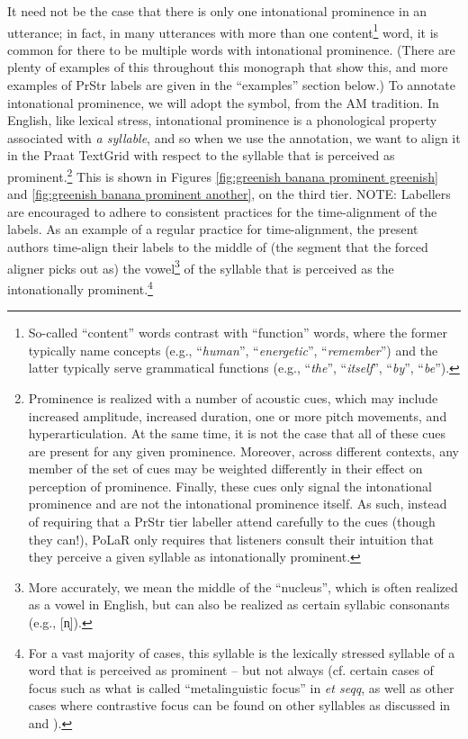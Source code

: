 \documentclass[11pt, twoside]{memoir}
\def\textlabel#1{{\relsize{-.5}\fontspec[Mapping=tex-text]{Roboto Mono}{#1}}}
\def\langtext#1{\textit{#1}}
\begin{document}
It need not be the case that there is only one intonational prominence in an utterance; in fact, in many utterances with more than one content\footnote{So-called “content” words contrast with “function” words, where the former typically name concepts (e.g., “\langtext{human}”, “\langtext{energetic}”, “\langtext{remember}”) and the latter typically serve grammatical functions (e.g., “\langtext{the}”, “\langtext{itself}”, “\langtext{by}”, “\langtext{be}”).} word, it is common for there to be multiple words with intonational prominence. (There are plenty of examples of this throughout this monograph that show this, and more examples of PrStr labels are given in the “examples” section below.)
To annotate intonational prominence, we will adopt the \textlabel{*} symbol, from the AM tradition. In English, like lexical stress, intonational prominence is a phonological property associated with \textit{a syllable}, and so when we use the \textlabel{*} annotation, we want to align it in the Praat TextGrid with respect to the syllable that is perceived as prominent.\footnote{Prominence is realized with a number of acoustic cues, which may include increased amplitude, increased duration, one or more pitch movements, and hyperarticulation. At the same time, it is not the case that all of these cues are present for any given prominence. Moreover, across different contexts, any member of the set of cues may be weighted differently in their effect on perception of prominence. Finally, these cues only signal the intonational prominence and are not the intonational prominence itself. As such, instead of requiring that a PrStr tier labeller attend carefully to the cues (though they can!), PoLaR only requires that listeners consult their intuition that they perceive a given syllable as intonationally prominent.\label{fn:prominence cues}} This is shown in Figures \ref{fig:greenish banana prominent greenish} and \ref{fig:greenish banana prominent another}, on the third tier.
NOTE: Labellers are encouraged to adhere to consistent practices for the time-alignment of the \textlabel{*} labels. As an example of a regular practice for time-alignment, the present authors time-align their \textlabel{*} labels to the middle of (the segment that the forced aligner picks out as) the vowel\footnote{More accurately, we mean the middle of the “nucleus”, which is often realized as a vowel in English, but can also be realized as certain syllabic consonants (e.g., [n̩]).} of the syllable that is perceived as the intonationally prominent.\footnote{For a vast majority of cases, this syllable is the lexically stressed syllable of a word that is perceived as prominent – but not always (cf. certain cases of focus such as what is called “metalinguistic focus” in \citealt{erteschik-shir99} \textit{et seqq}, as well as other cases where contrastive focus can be found on other syllables as discussed in \citealt{armstrongschwenter16} and \citealt{ahn-21a}).}
\end{document}
